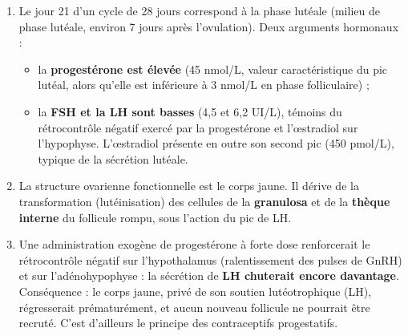 \documentclass[11pt]{article}
\newcommand{\cle}[1]{{\popxbold\color{popdark}#1}}
\begin{document}
\begin{corrige}
\begin{enumerate}
    \item Le jour 21 d'un cycle de 28 jours correspond à la \cle{phase lutéale} (milieu de phase lutéale, environ 7 jours après l'ovulation). Deux arguments hormonaux :
    \begin{itemize}
        \item la \textbf{progestérone est élevée} (45 nmol/L, valeur caractéristique du pic lutéal, alors qu'elle est inférieure à 3 nmol/L en phase folliculaire) ;
        \item la \textbf{FSH et la LH sont basses} (4,5 et 6,2 UI/L), témoins du rétrocontrôle négatif exercé par la progestérone et l'œstradiol sur l'hypophyse. L'œstradiol présente en outre son second pic (450 pmol/L), typique de la sécrétion lutéale.
    \end{itemize}
    \item La structure ovarienne fonctionnelle est le \cle{corps jaune}. Il dérive de la transformation (lutéinisation) des cellules de la \textbf{granulosa} et de la \textbf{thèque interne} du follicule rompu, sous l'action du pic de LH.
    \item Une administration exogène de progestérone à forte dose renforcerait le \cle{rétrocontrôle négatif} sur l'hypothalamus (ralentissement des pulses de GnRH) et sur l'adénohypophyse : la sécrétion de \textbf{LH chuterait encore davantage}. Conséquence : le corps jaune, privé de son soutien lutéotrophique (LH), régresserait prématurément, et aucun nouveau follicule ne pourrait être recruté. C'est d'ailleurs le principe des contraceptifs progestatifs.
\end{enumerate}
\end{corrige}
\end{document}
